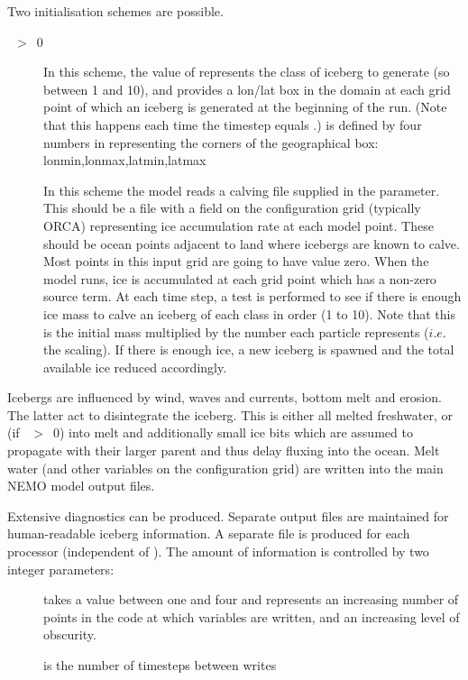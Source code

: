 \documentclass[../tex_main/NEMO_manual]{subfiles}
\begin{document}
Two initialisation schemes are possible.
\begin{description}
\item[~$>$~0]
In this scheme, the value of  represents the class of iceberg to generate 
(so between 1 and 10), and  provides a lon/lat box in the domain at each 
grid point of which an iceberg is generated at the beginning of the run. 
(Note that this happens each time the timestep equals .)
 is defined by four numbers in  representing the corners 
of the geographical box: lonmin,lonmax,latmin,latmax
\item[]
In this scheme the model reads a calving file supplied in the  parameter.
This should be a file with a field on the configuration grid (typically ORCA) representing ice accumulation rate at each model point. 
These should be ocean points adjacent to land where icebergs are known to calve.
Most points in this input grid are going to have value zero.
When the model runs, ice is accumulated at each grid point which has a non-zero source term.
At each time step, a test is performed to see if there is enough ice mass to calve an iceberg of each class in order (1 to 10).
Note that this is the initial mass multiplied by the number each particle represents ($i.e.$ the scaling).
If there is enough ice, a new iceberg is spawned and the total available ice reduced accordingly.
\end{description}

Icebergs are influenced by wind, waves and currents, bottom melt and erosion.
The latter act to disintegrate the iceberg. This is either all melted freshwater, or 
(if ~$>$~0) into melt and additionally small ice bits
which are assumed to propagate with their larger parent and thus delay fluxing into the ocean.
Melt water (and other variables on the configuration grid) are written into the main NEMO model output files.

Extensive diagnostics can be produced.
Separate output files are maintained for human-readable iceberg information.
A separate file is produced for each processor (independent of ).
The amount of information is controlled by two integer parameters:
\begin{description}
\item[]  takes a value between one and four and represents 
an increasing number of points in the code at which variables are written, and an 
increasing level of obscurity.
\item[] is the number of timesteps between writes
\end{description}
\end{document}
